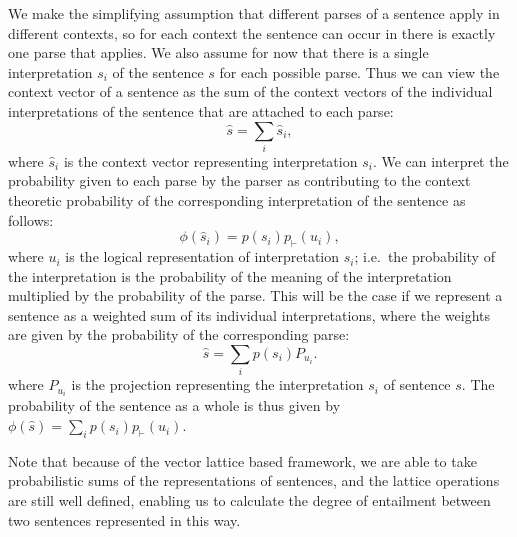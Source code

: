 We make the simplifying assumption that different parses of a sentence apply in different contexts, so for each context the sentence can occur in there is exactly one parse that applies. We also assume for now that there is a single interpretation $s_i$ of the sentence $s$ for each possible parse.
Thus we can view the context vector of a sentence as the sum of the context vectors of the individual interpretations of the sentence that are attached to each parse:
$$\hat{s} = \sum_i \hat{s}_i,$$
where $\hat{s}_i$ is the context vector representing interpretation $s_i$. We can interpret the probability given to each parse by the parser as contributing to the context theoretic probability of the corresponding interpretation of the sentence as follows:
$$\phi(\hat{s}_i) = p(s_i)p_\vdash(u_i),$$
where $u_i$ is the logical representation of interpretation $s_i$; i.e.~the probability of the interpretation is the probability of the meaning of the interpretation multiplied by the probability of the parse. This will be the case if we represent a sentence as a weighted sum of its individual interpretations, where the weights are given by the probability of the corresponding parse:
$$\hat{s} = \sum_i p(s_i)P_{u_i}.$$
where $P_{u_i}$ is the projection representing the interpretation $s_i$ of sentence $s$. The probability of the sentence as a whole is thus given by $\phi(\hat{s}) = \sum_i p(s_i)p_\vdash(u_i)$.

Note that because of the vector lattice based framework, we are able to take probabilistic sums of the representations of sentences, and the lattice operations are still well defined, enabling us to calculate the degree of entailment between two sentences represented in this way.

